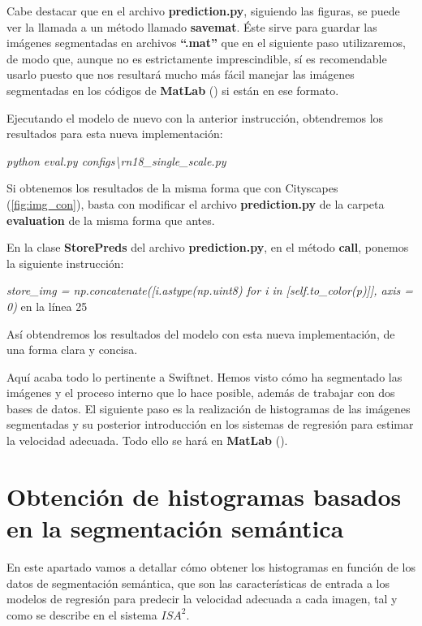 \begin{itemize}
Cabe destacar que en el archivo \textbf{prediction.py}, siguiendo las figuras, se puede ver la llamada a un método llamado \textbf{savemat}. Éste sirve para guardar las imágenes segmentadas en archivos \textbf{``.mat''} que en el siguiente paso utilizaremos, de modo que, aunque no es estrictamente imprescindible, sí es recomendable usarlo puesto que nos resultará mucho más fácil manejar las imágenes segmentadas en los códigos de \textbf{MatLab} (\cite{matlab}) si están en ese formato.

\end{itemize}

Ejecutando el modelo de nuevo con la anterior instrucción, obtendremos los resultados para esta nueva implementación:

\begin{center}
\textit{python eval.py configs\textbackslash{rn18\_single\_scale.py}}
\end{center}

Si obtenemos los resultados de la misma forma que con Cityscapes (\ref{fig:img_con}), basta con modificar el archivo \textbf{prediction.py} de la carpeta \textbf{evaluation} de la misma forma que antes.

En la clase \textbf{StorePreds} del archivo \textbf{prediction.py}, en el método \textbf{call}, ponemos la siguiente instrucción:

\begin{center}
\textit{store\_img = np.concatenate([i.astype(np.uint8) for i in [self.to\_color(p)]], axis = 0)} en la línea 25
\end{center}

Así obtendremos los resultados del modelo con esta nueva implementación, de una forma clara y concisa.

Aquí acaba todo lo pertinente a Swiftnet. Hemos visto cómo ha segmentado las imágenes y el proceso interno que lo hace posible, además de trabajar con dos bases de datos. El siguiente paso es la realización de histogramas de las imágenes segmentadas y su posterior introducción en los sistemas de regresión para estimar la velocidad adecuada. Todo ello se hará en \textbf{MatLab} (\cite{matlab}).

\section{Obtención de histogramas basados en la segmentación semántica}

En este apartado vamos a detallar cómo obtener los histogramas en función de los datos de segmentación semántica, que son las características de entrada a los modelos de regresión para predecir la velocidad adecuada a cada imagen, tal y como se describe en el sistema $ISA^{2}$.

